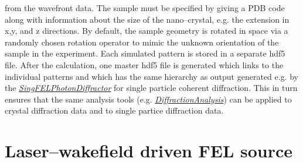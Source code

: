 \documentclass[12pt]{scrartcl}
\begin{document}
from the wavefront data. The sample must be specified by giving a PDB code along
with information about the size of the nano--crystal, e.g. the extension in x,y,
and z directions. By default, the sample geometry is rotated in space via a
randomly chosen rotation operator to mimic the unknown orientation of the sample
in the experiment. Each simulated pattern is stored in a separate hdf5 file.
After the calculation, one master hdf5 file is generated which links to the
individual patterns and which has the same hierarchy as output generated e.g. by
the
\href{https://eucall-software.github.io/simex_platform/#SimEx.Calculators.SingFELPhotonDiffractor.SingFELPhotonDiffractor}{\textit{SingFELPhotonDiffractor}}
for single particle coherent diffraction. This in turn ensures that the same
analysis tools (e.g.
\href{https://eucall-software.github.io/simex_platform/#SimEx.Analysis.DiffractionAnalysis.DiffractionAnalysis}{\textit{DiffractionAnalysis}})
can be applied to crystal diffraction data and to single partice diffraction
data.

%
\section{Laser--wakefield driven FEL source}\label{sec:lwfa_source}



\printbibliography[notkeyword=report, notkeyword=zenodo, title={Journal articles}]
%
\printbibliography[keyword=eucall, keyword=report, title={EUCALL Reports}]
%
\printbibliography[keyword=zenodo, title={EUCALL Data Repository Depositions}]
\end{document}
